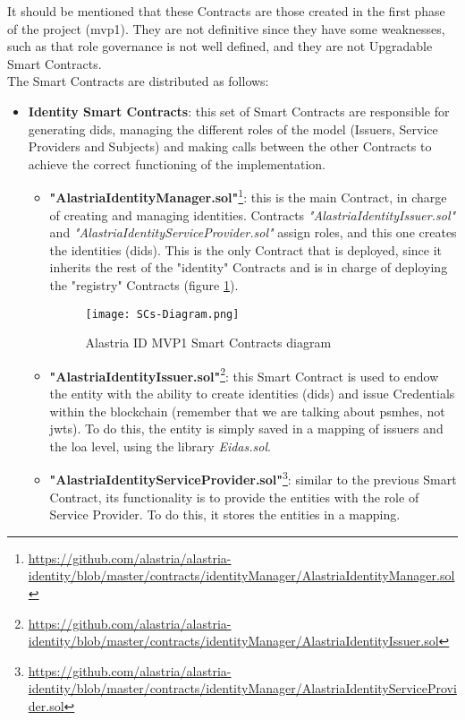             It should be mentioned that these Contracts are those created in the first phase of the project (\acrshort{mvp}1). They are not definitive since they have some weaknesses, such as that role governance is not well defined, and they are not Upgradable Smart Contracts.\\
            
            The Smart Contracts are distributed as follows:
            \begin{itemize}
                \item \textbf{Identity Smart Contracts}: this set of Smart Contracts are responsible for generating \acrshort{did}s, managing the different roles of the model (Issuers, Service Providers and Subjects) and making calls between the other Contracts to achieve the correct functioning of the implementation.
                \begin{itemize}
                    \item \textbf{"AlastriaIdentityManager.sol"}\footnote{\url{https://github.com/alastria/alastria-identity/blob/master/contracts/identityManager/AlastriaIdentityManager.sol}}: this is the main Contract, in charge of creating and managing identities. Contracts \textit{"AlastriaIdentityIssuer.sol"} and \textit{"AlastriaIdentityServiceProvider.sol"} assign roles, and this one creates the identities (\acrshort{did}s). This is the only Contract that is deployed, since it inherits the rest of the "identity" Contracts and is in charge of deploying the "registry" Contracts (figure \ref{fig:mvp1-contracts}).
                    \begin{figure}[h]
                        \centering
                        \texttt{[image: SCs-Diagram.png]}
                        \caption{Alastria ID MVP1 Smart Contracts diagram}
                        \label{fig:mvp1-contracts}
                    \end{figure}
                    \item \textbf{"AlastriaIdentityIssuer.sol"}\footnote{\url{https://github.com/alastria/alastria-identity/blob/master/contracts/identityManager/AlastriaIdentityIssuer.sol}}: this Smart Contract is used to endow the entity with the ability to create identities (\acrshort{did}s) and issue Credentials within the blockchain (remember that we are talking about \acrshort{psmh}es, not \acrshort{jwt}s). To do this, the entity is simply saved in a mapping of issuers and the \acrshort{loa} level, using the library \textit{Eidas.sol}.
                    \item \textbf{"AlastriaIdentityServiceProvider.sol"}\footnote{\url{https://github.com/alastria/alastria-identity/blob/master/contracts/identityManager/AlastriaIdentityServiceProvider.sol}}: similar to the previous Smart Contract, its functionality is to provide the entities with the role of Service Provider. To do this, it stores the entities in a mapping.

\end{itemize}
\end{itemize}
